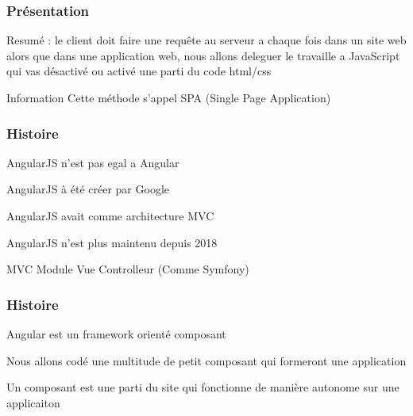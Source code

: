 \documentclass[10pt]{beamer}
\begin{document}
	\begin{frame}
		\frametitle{Présentation}

		Resumé :
		\newline \newline
		le client doit faire une requête au serveur a chaque fois dans un site web \newline \newline
		alors que dans une application web, nous allons deleguer le travaille a JavaScript qui vas désactivé ou activé une parti du code html/css
		\newline \newline
		\begin{block}{Information}
			Cette méthode s'appel SPA (Single Page Application)
		\end{block}
	\end{frame}


	\begin{frame}
		\frametitle{Histoire}

		AngularJS n'est pas egal a Angular \newline \newline

		AngularJS à été créer par Google \newline \newline

		AngularJS avait comme architecture MVC \newline \newline

		AngularJS n'est plus maintenu depuis 2018 \newline \newline

		\begin{block}{MVC}
			Module Vue Controlleur (Comme Symfony)
		\end{block}

	\end{frame}

	\begin{frame}
		\frametitle{Histoire}

		Angular est un framework orienté composant \newline \newline

		Nous allons codé une multitude de petit composant qui formeront une application \newline \newline

		Un composant est une parti du site qui fonctionne de manière autonome sur une applicaiton

	\end{frame}
\end{document}
